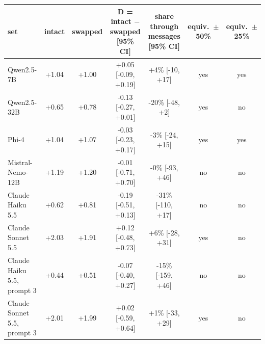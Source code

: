 \begin{tabular}{lccccc c}
\toprule
 set & intact & swapped & D = intact $-$ swapped [95\% CI] & share through messages [95\% CI] & equiv.\ $\pm$50\% & equiv.\ $\pm$25\% \\
\midrule
Qwen2.5-7B & +1.04 & +1.00 & +0.05 [-0.09, +0.19] & +4\% [-10, +17] & yes & yes \\
Qwen2.5-32B & +0.65 & +0.78 & -0.13 [-0.27, +0.01] & -20\% [-48, +2] & yes & no \\
Phi-4 & +1.04 & +1.07 & -0.03 [-0.23, +0.17] & -3\% [-24, +15] & yes & yes \\
Mistral-Nemo-12B & +1.19 & +1.20 & -0.01 [-0.71, +0.70] & -0\% [-93, +46] & no & no \\
Claude Haiku 5.5 & +0.62 & +0.81 & -0.19 [-0.51, +0.13] & -31\% [-110, +17] & no & no \\
Claude Sonnet 5.5 & +2.03 & +1.91 & +0.12 [-0.48, +0.73] & +6\% [-28, +31] & yes & no \\
Claude Haiku 5.5, prompt 3 & +0.44 & +0.51 & -0.07 [-0.40, +0.27] & -15\% [-159, +46] & no & no \\
Claude Sonnet 5.5, prompt 3 & +2.01 & +1.99 & +0.02 [-0.59, +0.64] & +1\% [-33, +29] & yes & no \\
\bottomrule
\end{tabular}
